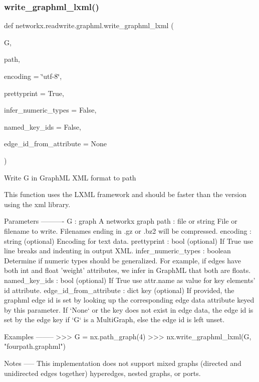 \subsubsection{\texorpdfstring{write\+\_\+graphml\+\_\+lxml()}{write\_graphml\_lxml()}}
{\footnotesize\ttfamily def networkx.\+readwrite.\+graphml.\+write\+\_\+graphml\+\_\+lxml (\begin{DoxyParamCaption}\item[{}]{G,  }\item[{}]{path,  }\item[{}]{encoding = {\ttfamily \char`\"{}utf-\/8\char`\"{}},  }\item[{}]{prettyprint = {\ttfamily True},  }\item[{}]{infer\+\_\+numeric\+\_\+types = {\ttfamily False},  }\item[{}]{named\+\_\+key\+\_\+ids = {\ttfamily False},  }\item[{}]{edge\+\_\+id\+\_\+from\+\_\+attribute = {\ttfamily None} }\end{DoxyParamCaption})}

\begin{DoxyVerb}Write G in GraphML XML format to path

This function uses the LXML framework and should be faster than
the version using the xml library.

Parameters
----------
G : graph
   A networkx graph
path : file or string
   File or filename to write.
   Filenames ending in .gz or .bz2 will be compressed.
encoding : string (optional)
   Encoding for text data.
prettyprint : bool (optional)
   If True use line breaks and indenting in output XML.
infer_numeric_types : boolean
   Determine if numeric types should be generalized.
   For example, if edges have both int and float 'weight' attributes,
   we infer in GraphML that both are floats.
named_key_ids : bool (optional)
   If True use attr.name as value for key elements' id attribute.
edge_id_from_attribute : dict key (optional)
    If provided, the graphml edge id is set by looking up the corresponding
    edge data attribute keyed by this parameter. If `None` or the key does not exist in edge data,
    the edge id is set by the edge key if `G` is a MultiGraph, else the edge id is left unset.

Examples
--------
>>> G = nx.path_graph(4)
>>> nx.write_graphml_lxml(G, "fourpath.graphml")

Notes
-----
This implementation does not support mixed graphs (directed
and unidirected edges together) hyperedges, nested graphs, or ports.
\end{DoxyVerb}
 \mbox{\label{namespacenetworkx_1_1readwrite_1_1graphml_a402f85085b78287200232129e44d5415}} 
